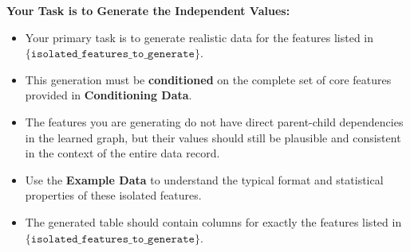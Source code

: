 \begin{tcolorbox}
\textbf{Your Task is to Generate the Independent Values:}
\begin{itemize}[leftmargin=*, itemsep=2pt]
    \item Your primary task is to generate realistic data for the features listed in $\texttt{\{isolated\_features\_to\_generate}\}$.
    \item This generation must be \textbf{conditioned} on the complete set of core features provided in \textbf{Conditioning Data}.
    \item The features you are generating do not have direct parent-child dependencies in the learned graph, but their values should still be plausible and consistent in the context of the entire data record.
    \item Use the \textbf{Example Data} to understand the typical format and statistical properties of these isolated features.
    \item The generated table should contain columns for exactly the features listed in $\texttt{\{isolated\_features\_to\_generate}\}$.
\end{itemize}
\label{prompt:data_gen_iso}
\end{tcolorbox}

\clearpage
